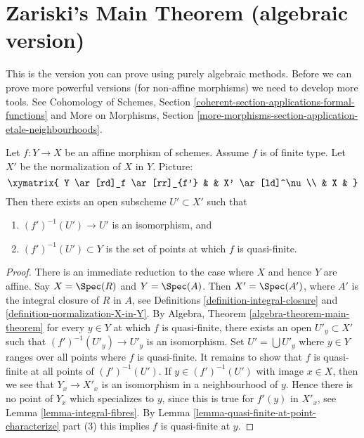 \section{Zariski's Main Theorem (algebraic version)}
\label{section-Zariski}

\noindent
This is the version you can prove using purely algebraic methods.
Before we can prove more powerful versions (for non-affine morphisms)
we need to develop more tools. See Cohomology of Schemes, Section
\ref{coherent-section-applications-formal-functions}
and
More on Morphisms, Section
\ref{more-morphisms-section-application-etale-neighbourhoods}.

\begin{theorem}
\label{theorem-main-theorem}
Let $f : Y \to X$ be an affine morphism of schemes.
Assume $f$ is of finite type.
Let $X'$ be the normalization of $X$ in $Y$. Picture:
$$
\xymatrix{
Y \ar[rd]_f \ar[rr]_{f'} & & X' \ar[ld]^\nu \\
& X &
}
$$
Then there exists an open subscheme $U' \subset X'$ such that
\begin{enumerate}
\item $(f')^{-1}(U') \to U'$ is an isomorphism, and
\item $(f')^{-1}(U') \subset Y$ is the set of points at which
$f$ is quasi-finite.
\end{enumerate}
\end{theorem}

\begin{proof}
There is an immediate reduction to the case where $X$ and hence $Y$
are affine. Say $X = \Spec(R)$ and $Y = \Spec(A)$.
Then $X' = \Spec(A')$, where $A'$ is the integral closure of
$R$ in $A$, see Definitions \ref{definition-integral-closure}
and \ref{definition-normalization-X-in-Y}. By
Algebra, Theorem \ref{algebra-theorem-main-theorem}
for every $y \in Y$ at which $f$ is quasi-finite, there exists an
open $U'_y \subset X'$ such that $(f')^{-1}(U'_y) \to U'_y$
is an isomorphism. Set $U' = \bigcup U'_y$ where $y \in Y$ ranges
over all points where $f$ is quasi-finite. It remains to show that
$f$ is quasi-finite at all points of $(f')^{-1}(U')$.
If $y \in (f')^{-1}(U')$ with image $x \in X$, then we see that
$Y_x \to X'_x$ is an isomorphism in a neighbourhood of $y$. Hence
there is no point of $Y_x$ which specializes to $y$, since this
is true for $f'(y)$ in $X'_x$, see Lemma \ref{lemma-integral-fibres}.
By Lemma \ref{lemma-quasi-finite-at-point-characterize} part (3)
this implies $f$ is quasi-finite at $y$.
\end{proof}

